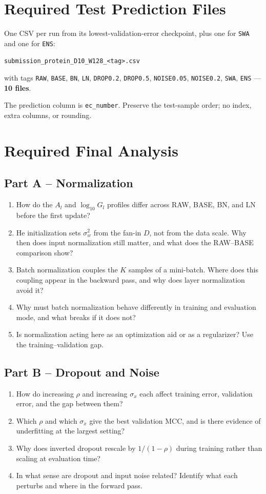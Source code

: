 \documentclass[11pt]{article}
\begin{document}
\section{Required Test Prediction Files}
One CSV per run from its lowest-validation-error checkpoint, plus one for \texttt{SWA} and one for \texttt{ENS}:
\begin{center}
\texttt{submission\_protein\_D10\_W128\_<tag>.csv}
\end{center}
with tags \texttt{RAW}, \texttt{BASE}, \texttt{BN}, \texttt{LN}, \texttt{DROP0.2}, \texttt{DROP0.5}, \texttt{NOISE0.05}, \texttt{NOISE0.2}, \texttt{SWA}, \texttt{ENS} --- \textbf{10 files}.

The prediction column is \texttt{ec\_number}. Preserve the test-sample order; no index, extra columns, or rounding.

\section{Required Final Analysis}

\subsection*{Part A -- Normalization}
\begin{enumerate}
    \item How do the $A_l$ and $\log_{10}G_l$ profiles differ across RAW, BASE, BN, and LN before the first update?
    \item He initialization sets $\sigma_w^2$ from the fan-in $D$, not from the data scale. Why then does input normalization still matter, and what does the RAW--BASE comparison show?
    \item Batch normalization couples the $K$ samples of a mini-batch. Where does this coupling appear in the backward pass, and why does layer normalization avoid it?
    \item Why must batch normalization behave differently in training and evaluation mode, and what breaks if it does not?
    \item Is normalization acting here as an optimization aid or as a regularizer? Use the training--validation gap.
\end{enumerate}

\subsection*{Part B -- Dropout and Noise}
\begin{enumerate}
    \item How do increasing $\rho$ and increasing $\sigma_x$ each affect training error, validation error, and the gap between them?
    \item Which $\rho$ and which $\sigma_x$ give the best validation MCC, and is there evidence of underfitting at the largest setting?
    \item Why does inverted dropout rescale by $1/(1-\rho)$ during training rather than scaling at evaluation time?
    \item In what sense are dropout and input noise related? Identify what each perturbs and where in the forward pass.
\end{enumerate}
\end{document}
